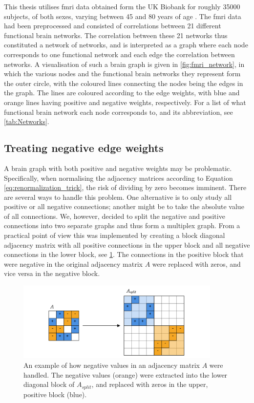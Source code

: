 This thesis utilises \acrshort{fmri} data obtained form the UK Biobank for roughly 35000 subjects, of both sexes, varying between 45 and 80 years of age \cite{ukbiobank}. The \acrshort{fmri} data had been preprocessed and consisted of correlations between 21 different functional brain networks. The correlation between these 21 networks thus constituted a network of networks, and is interpreted as a graph where each node corresponds to one functional network and each edge the correlation between networks. A visualisation of such a brain graph is given in \cref{fig:fmri_network}, in which the various nodes and the functional brain networks they represent form the outer circle, with the coloured lines connecting the nodes being the edges in the graph. The lines are coloured according to the edge weights, with blue and orange lines having positive and negative weights, respectively. For a list of what functional brain network each node corresponds to, and its abbreviation, see \cref{tab:Networks}.

\subsection{Treating negative edge weights}
A brain graph with both positive and negative weights may be problematic. Specifically, when normalising the adjacency matrices according to Equation \eqref{eq:renormalization_trick}, the risk of dividing by zero becomes imminent. There are several ways to handle this problem. One alternative is to only study all positive or all negative connections; another might be to take the absolute value of all connections. We, however, decided to split the negative and positive connections into two separate graphs and thus form a multiplex graph. From a practical point of view this was implemented by creating a block diagonal adjacency matrix with all positive connections in the upper block and all negative connections in the lower block, see \cref{fig:block_diagonal_adjacency_matrix}. The connections in the positive block that were negative in the original adjacency matrix $A$ were replaced with zeros, and vice versa in the negative block.

\begin{figure}[!htbp]
    \centering
    \includegraphics[width=0.9\textwidth]{chapters/images_methods/split.png}
    \caption{An example of how negative values in an adjacency matrix $A$ were handled. The negative values (orange) were extracted into the lower diagonal block of $A_{split}$, and replaced with zeros in the upper, positive block (blue).}
    \label{fig:block_diagonal_adjacency_matrix}
\end{figure}

